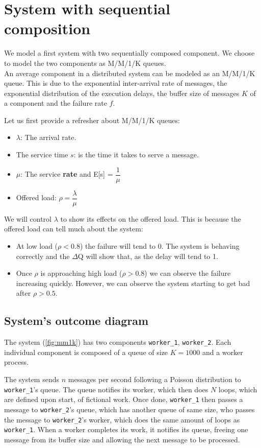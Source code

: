 \section{System with sequential composition}
    We model a first system with two sequentially composed component. We choose to model the two components as M/M/1/K queues. \\
    An average component in a distributed system can be modeled as an M/M/1/K queue. This is due to the exponential inter-arrival rate of messages, the exponential distribution of the execution delays, the buffer size of messages $K$ of a component and the failure rate $f$. \cite{dq-tut}
    
    Let us first provide a refresher about M/M/1/K queues:
    \begin{itemize}
        \item $\lambda$: The arrival rate.
        \item The service time $s$: is the time it takes to serve a message.
        \item $\mu$: The service \textbf{rate} and E[s] = $\dfrac{1}{\mu}$
        \item Offered load: $\rho = \dfrac{\lambda}{\mu}$
    \end{itemize}

    We will control $\lambda$ to show its effects on the offered load. This is because the offered load can tell much about the system:
    \begin{itemize}
        \item At low load ($\rho < 0.8$) the failure will tend to 0. The system is behaving correctly and the $\Delta$Q will show that, as the delay will tend to 1.
        \item Once $\rho$ is approaching high load ($\rho > 0.8$) we can observe the failure increasing quickly. However, we can observe the system starting to get bad after $\rho > 0.5$. \cite{dq-tut}
    \end{itemize}
    
    \subsection{System's outcome diagram}
    The system (\cref{fig:mm1k}) has two components \texttt{worker\_1}, \texttt{worker\_2}. Each individual component is composed of a queue of size $K = 1000$ and a worker process.
    
    The system sends $n$ messages per second following a Poisson distribution to \texttt{worker\_1}'s queue. 
    The queue notifies its worker, which then does $N$ loops, which are defined upon start, of fictional work. Once done, \texttt{worker\_1} then passes a message to \texttt{worker\_2}'s queue, which has another queue of same size, who passes the message to \texttt{worker\_2}'s worker, which does the same amount of loops as \texttt{worker\_1}. When a worker completes its work, it notifies its queue, freeing one message from its buffer size and allowing the next message to be processed.
    
